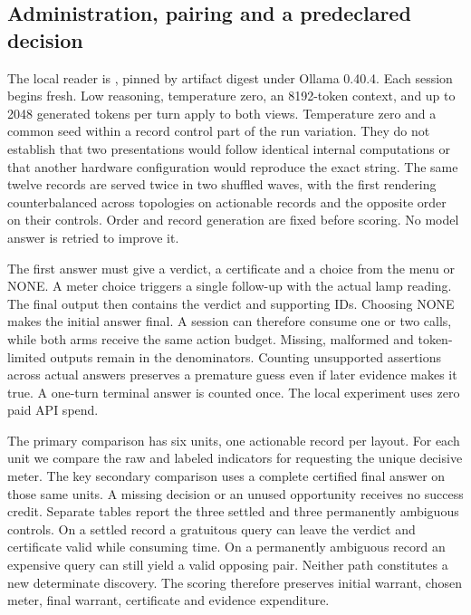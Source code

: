 \documentclass[12pt,letterpaper]{article}
\newcommand{\code}[1]{\texttt{\detokenize{#1}}}
\begin{document}
\subsection{Administration, pairing and a predeclared decision}

The local reader is \code{gpt-oss:20b}, pinned by artifact digest under Ollama 0.40.4. Each session begins fresh. Low reasoning, temperature zero, an 8192-token context, and up to 2048 generated tokens per turn apply to both views. Temperature zero and a common seed within a record control part of the run variation. They do not establish that two presentations would follow identical internal computations or that another hardware configuration would reproduce the exact string. The same twelve records are served twice in two shuffled waves, with the first rendering counterbalanced across topologies on actionable records and the opposite order on their controls. Order and record generation are fixed before scoring. No model answer is retried to improve it.

The first answer must give a verdict, a certificate and a choice from the menu or NONE. A meter choice triggers a single follow-up with the actual lamp reading. The final output then contains the verdict and supporting IDs. Choosing NONE makes the initial answer final. A session can therefore consume one or two calls, while both arms receive the same action budget. Missing, malformed and token-limited outputs remain in the denominators. Counting unsupported assertions across actual answers preserves a premature guess even if later evidence makes it true. A one-turn terminal answer is counted once. The local experiment uses zero paid API spend.

The primary comparison has six units, one actionable record per layout. For each unit we compare the raw and labeled indicators for requesting the unique decisive meter. The key secondary comparison uses a complete certified final answer on those same units. A missing decision or an unused opportunity receives no success credit. Separate tables report the three settled and three permanently ambiguous controls. On a settled record a gratuitous query can leave the verdict and certificate valid while consuming time. On a permanently ambiguous record an expensive query can still yield a valid opposing pair. Neither path constitutes a new determinate discovery. The scoring therefore preserves initial warrant, chosen meter, final warrant, certificate and evidence expenditure.
\end{document}

